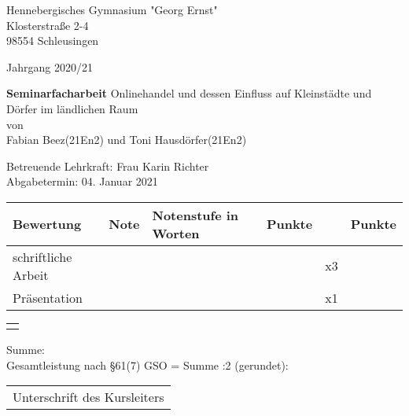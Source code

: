 \begin{titlepage}
    
    \raggedright
        Hennebergisches Gymnasium "Georg Ernst"\\
        Klosterstraße 2-4\\
        98554 Schleusingen
        
    \raggedleft\vspace*{-1.9cm}
        Jahrgang 2020/21
            \vfill\vfill\vfill\vfill\vfill\vfill

    \centering
        \LARGE\textbf{Seminarfacharbeit} %
            \vfill
        \large Onlinehandel und dessen Einfluss auf Kleinstädte und Dörfer im ländlichen Raum\\[\baselineskip]
        von\\
        Fabian Beez(21En2) und Toni Hausdörfer(21En2)
            \vfill\vfill\vfill\vfill

    \raggedright
        Betreuende Lehrkraft: \hfill Frau Karin Richter\\
        Abgabetermin: \hfill 04. Januar 2021\\[\baselineskip]
        \begin{tabular}[h]{|l|l|l|l|l|l|}
            \hline
            Bewertung & Note & Notenstufe in Worten & Punkte &  & Punkte \\
            \hline
            schriftliche Arbeit & & & & x3 & \\
            \hline
            Präsentation & & & & x1 & \\
            \hline
        \end{tabular}

    \raggedleft\vspace*{-0.05cm}
        \begin{tabular}[h]{|p{1.56cm}|}
            \hline
            \\
            \hline
            \\
            \hline
        \end{tabular}

    \raggedright\vspace*{-1.4cm}
        \hspace*{0.2cm}Summe: \hfill\\
        \hspace*{0.2cm}Gesamtleistung nach §61(7) GSO = Summe :2 (gerundet): \hfill\\[\baselineskip]
            \vfill\vfill\vfill
        
    \raggedleft
        \begin{tabular}{@{}l@{}}\hline
            Unterschrift des Kursleiters
        \end{tabular}
            \vfill\vfill
\end{titlepage}

\newpage
